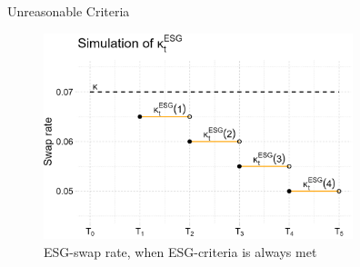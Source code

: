 \documentclass[UKenglish]{beamer}
\begin{document}
\begin{frame}{Unreasonable Criteria}
\begin{figure}[htp]
    \centering
    \includegraphics[width= 9cm]{ESG/kappa_t_ESG_2.png}
    \caption{ESG-swap rate, when ESG-criteria is always met}
    \label{fig: ESG_swap_2}
\end{figure}
\end{frame}

\end{document}
